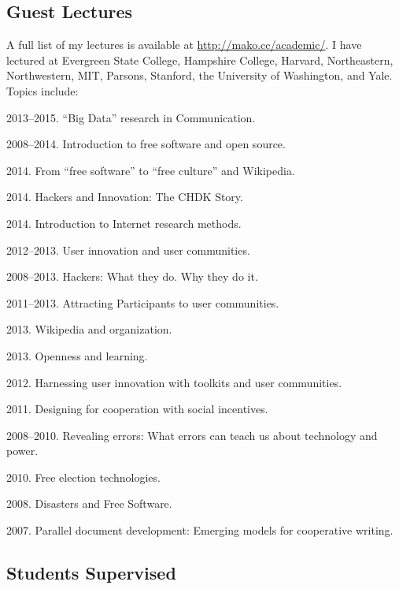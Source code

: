 \documentclass[10pt]{article}
\newenvironment{cvlist}{
\begin{list}{}{\leftmargin=3.0em \itemindent=-3.0em}
  \setlength{\itemsep}{0pt}
  \setlength{\parskip}{0em}
  \setlength{\parsep}{1em}
  \setlength{\parindent}{0em}}
{\vspace{1em}
\end{list}}
\begin{document}
\subsection{Guest Lectures}

A full list of my lectures is available at \url{http://mako.cc/academic/}. I have lectured at Evergreen State College, Hampshire College, Harvard, Northeastern, Northwestern, MIT, Parsons, Stanford, the University of Washington, and Yale. Topics include:

\begin{cvlist}

\item 2013--2015. ``Big Data'' research in Communication.
\item 2008--2014. Introduction to free software and open source.
\item 2014. From ``free software'' to ``free culture'' and Wikipedia.
\item 2014. Hackers and Innovation: The CHDK Story.
\item 2014. Introduction to Internet research methods.
\item 2012--2013. User innovation and user communities.
\item 2008--2013. Hackers: What they do. Why they do it.
\item 2011--2013. Attracting Participants to user communities.
\item 2013. Wikipedia and organization.
\item 2013. Openness and learning.
\item 2012. Harnessing user innovation with toolkits and user communities.
\item 2011. Designing for cooperation with social incentives.
\item 2008--2010. Revealing errors: What errors can teach us about technology and power.
\item 2010. Free election technologies.
\item 2008. Disasters and Free Software.
\item 2007. Parallel document development: Emerging models for cooperative writing.
\end{cvlist}

\subsection{Students Supervised}
\end{document}
